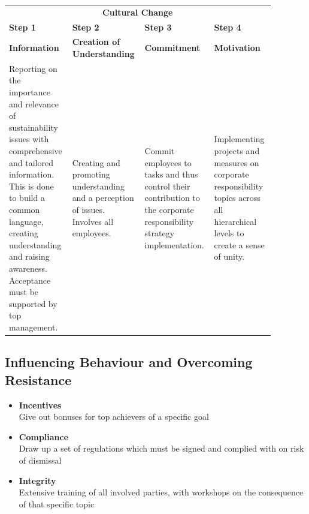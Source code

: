 \documentclass[11pt]{article}
\theoremstyle{definition}
\begin{document}
\begin{tabularx}{\linewidth}{p{0.22\linewidth} p{0.22\linewidth} p{0.22\linewidth} p{0.22\linewidth}}
	\multicolumn{4}{c}{\cellcolor{DodgerBlue1!40} \textbf{Cultural Change}}\\[0.5em]
	\textbf{Step 1} & \textbf{Step 2} & \textbf{Step 3} & \textbf{Step 4}\\
	\textbf{Information} & \textbf{Creation of Understanding} & \textbf{Commitment} & \textbf{Motivation}\\[1.5em]
	Reporting on the importance and relevance of sustainability issues with comprehensive and tailored information. This is done to build a common language, creating understanding and raising awareness. Acceptance must be supported by top management. & Creating and promoting understanding and a perception of issues. Involves all employees. & Commit employees to tasks and thus control their contribution to the corporate responsibility strategy implementation. & Implementing projects and measures on corporate responsibility topics across all hierarchical levels to create a sense of unity.
\end{tabularx}

\subsection{Influencing Behaviour and Overcoming Resistance}
\begin{itemize}
	\item \textbf{Incentives}\\ Give out bonuses for top achievers of a specific goal
	\item \textbf{Compliance}\\ Draw up a set of regulations which must be signed and complied with on risk of dismissal
	\item \textbf{Integrity}\\ Extensive training of all involved parties, with workshops on the consequence of that specific topic
\end{itemize}
\end{document}
